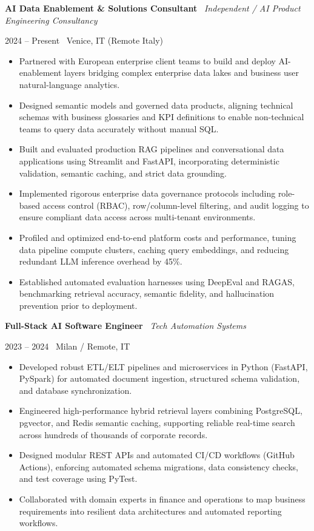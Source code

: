 \documentclass[a4paper,10pt]{article}
\newcommand{\role}[4]{%
  \vspace{2pt}\noindent
  \begin{minipage}[t]{0.70\textwidth}\raggedright\textbf{#1} \textbullet\ \textit{#3}\end{minipage}%
  \hfill
  \begin{minipage}[t]{0.28\textwidth}\raggedleft\footnotesize\color{gray}#2 \textbullet\ #4\end{minipage}%
  \vspace{1pt}%
}
\begin{document}
\role{AI Data Enablement \& Solutions Consultant}{2024 -- Present}{Independent / AI Product Engineering Consultancy}{Venice, IT (Remote Italy)}
\begin{itemize}
  \item Partnered with European enterprise client teams to build and deploy AI-enablement layers bridging complex enterprise data lakes and business user natural-language analytics.
  \item Designed semantic models and governed data products, aligning technical schemas with business glossaries and KPI definitions to enable non-technical teams to query data accurately without manual SQL.
  \item Built and evaluated production RAG pipelines and conversational data applications using Streamlit and FastAPI, incorporating deterministic validation, semantic caching, and strict data grounding.
  \item Implemented rigorous enterprise data governance protocols including role-based access control (RBAC), row/column-level filtering, and audit logging to ensure compliant data access across multi-tenant environments.
  \item Profiled and optimized end-to-end platform costs and performance, tuning data pipeline compute clusters, caching query embeddings, and reducing redundant LLM inference overhead by 45\%.
  \item Established automated evaluation harnesses using DeepEval and RAGAS, benchmarking retrieval accuracy, semantic fidelity, and hallucination prevention prior to deployment.
\end{itemize}

\vspace{3pt}
\role{Full-Stack AI Software Engineer}{2023 -- 2024}{Tech Automation Systems}{Milan / Remote, IT}
\begin{itemize}
  \item Developed robust ETL/ELT pipelines and microservices in Python (FastAPI, PySpark) for automated document ingestion, structured schema validation, and database synchronization.
  \item Engineered high-performance hybrid retrieval layers combining PostgreSQL, pgvector, and Redis semantic caching, supporting reliable real-time search across hundreds of thousands of corporate records.
  \item Designed modular REST APIs and automated CI/CD workflows (GitHub Actions), enforcing automated schema migrations, data consistency checks, and test coverage using PyTest.
  \item Collaborated with domain experts in finance and operations to map business requirements into resilient data architectures and automated reporting workflows.
\end{itemize}
\end{document}

